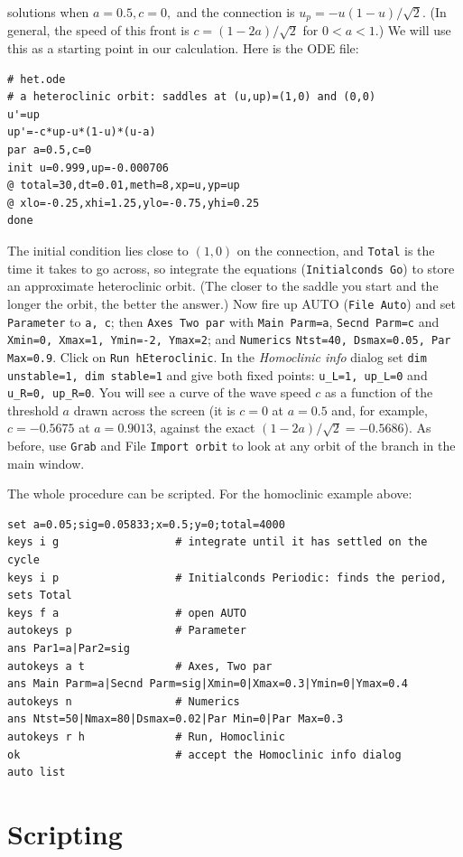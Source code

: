 \documentclass{article}
\newcommand{\TCC}[1]{\medskip

\addcontentsline{toc}{subsubsection}{#1}
\noindent{\bf {#1}.}}
\begin{document}
solutions when $a=0.5,c=0,$ and the connection is $u_p=-u(1-u)/\sqrt{2}.$
(In general, the speed of this front is $c=(1-2a)/\sqrt{2}$ for $0<a<1.$)  We will use this as a
starting point in our calculation.
Here is the ODE file:
\begin{verbatim}
# het.ode
# a heteroclinic orbit: saddles at (u,up)=(1,0) and (0,0)
u'=up
up'=-c*up-u*(1-u)*(u-a)
par a=0.5,c=0
init u=0.999,up=-0.000706
@ total=30,dt=0.01,meth=8,xp=u,yp=up
@ xlo=-0.25,xhi=1.25,ylo=-0.75,yhi=0.25
done
\end{verbatim}
The initial condition lies close to $(1,0)$ on the connection, and {\tt Total} is the time it takes
to go across, so integrate the equations ({\tt Initialconds Go}) to store an approximate
heteroclinic orbit.  (The closer to the saddle you start and the longer the orbit, the
better the answer.)  Now fire up AUTO ({\tt File Auto}) and set
{\tt Parameter} to {\tt a, c}; then {\tt Axes Two par} with {\tt Main Parm=a},
{\tt Secnd Parm=c} and {\tt Xmin=0, Xmax=1, Ymin=-2, Ymax=2}; and {\tt Numerics}
{\tt Ntst=40, Dsmax=0.05, Par Max=0.9}.  Click on {\tt Run hEteroclinic}.  In the {\em
Homoclinic info} dialog set {\tt dim unstable=1, dim stable=1} and give both fixed
points: {\tt u\_L=1, up\_L=0} and {\tt u\_R=0, up\_R=0}.  You will see a curve of
the wave speed $c$ as a function of the threshold $a$ drawn across the screen
(it is $c=0$ at $a=0.5$ and, for example, $c=-0.5675$ at $a=0.9013$, against the exact
$(1-2a)/\sqrt{2}=-0.5686$).  As before, use {\tt Grab} and File {\tt Import orbit}
to look at any orbit of the branch in the main window.

\TCC{Scripts}  The whole procedure can be scripted.  For the homoclinic example above:
\begin{verbatim}
set a=0.05;sig=0.05833;x=0.5;y=0;total=4000
keys i g                  # integrate until it has settled on the cycle
keys i p                  # Initialconds Periodic: finds the period, sets Total
keys f a                  # open AUTO
autokeys p                # Parameter
ans Par1=a|Par2=sig
autokeys a t              # Axes, Two par
ans Main Parm=a|Secnd Parm=sig|Xmin=0|Xmax=0.3|Ymin=0|Ymax=0.4
autokeys n                # Numerics
ans Ntst=50|Nmax=80|Dsmax=0.02|Par Min=0|Par Max=0.3
autokeys r h              # Run, Homoclinic
ok                        # accept the Homoclinic info dialog
auto list
\end{verbatim}

\section{Scripting}\label{scripting}
\end{document}

